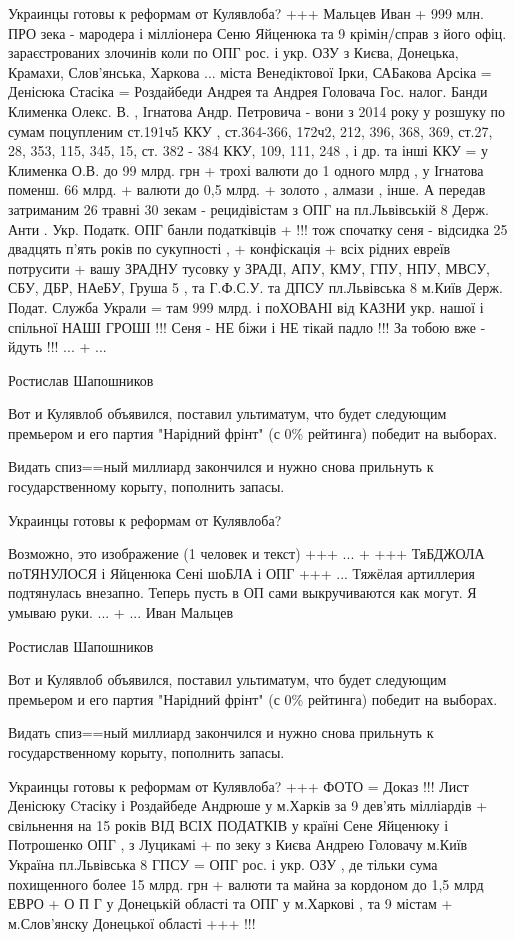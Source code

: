 \begin{itemize}
Украинцы готовы к реформам от Кулявлоба? +++ Мальцев Иван + 999 млн. ПРО зека -
мародера і мілліонера Сеню Яйценюка та 9 крімін/справ з його офіц.
зараєстрованих злочинів коли по ОПГ рос. і укр. ОЗУ з Києва, Донецька, Крамахи,
Слов'янська, Харкова ... міста Венедіктової Ірки, САБакова Арсіка = Денісюка
Стасіка = Роздайбеди Андрея та Андрея Головача Гос. налог. Банди Клименка
Олекс. В. , Ігнатова Андр. Петровича - вони з 2014 року у розшуку по сумам
поцупленим ст.191ч5 ККУ , ст.364-366, 172ч2, 212, 396, 368, 369, ст.27, 28,
353, 115, 345, 15, ст. 382 - 384 ККУ, 109, 111, 248 , і др. та інші ККУ = у
Клименка О.В. до 99 млрд. грн + трохі валюти до 1 одного млрд , у Ігнатова
поменш. 66 млрд. + валюти до 0,5 млрд. + золото , алмази , інше. А передав
затриманим 26 травні 30 зекам - рецидівістам з ОПГ на пл.Львівській 8 Держ.
Анти . Укр. Податк. ОПГ банли податківців + !!! тож спочатку сеня - відсидка 25
двадцять п'ять років по сукупності , + конфіскація + всіх рідних евреїв
потрусити + вашу ЗРАДНУ тусовку у ЗРАДІ, АПУ, КМУ, ГПУ, НПУ, МВСУ, СБУ, ДБР,
НАеБУ, Груша 5 , та Г.Ф.С.У. та ДПСУ пл.Львівська 8 м.Київ Держ. Подат. Служба
Украли = там 999 млрд. і поХОВАНІ від КАЗНИ укр. нашої і спільної НАШІ ГРОШІ
!!! Сеня - НЕ біжи і НЕ тікай падло !!! За тобою вже - йдуть !!! ... + ...

Ростислав Шапошников

Вот и Кулявлоб объявился, поставил ультиматум, что будет следующим премьером и
его партия "Нарідний фрінт" (с 0\% рейтинга) победит на выборах.

Видать спиз==ный миллиард закончился и нужно снова прильнуть к государственному корыту, пополнить запасы.

Украинцы готовы к реформам от Кулявлоба?

Возможно, это изображение (1 человек и текст) +++ ... + +++ ТяБДЖОЛА поТЯНУЛОСЯ
і Яйценюка Сені шоБЛА і ОПГ +++ ... Тяжёлая артиллерия подтянулась внезапно.
Теперь пусть в ОП сами выкручиваются как могут. Я умываю руки. ... + ... Иван
Мальцев

Ростислав Шапошников

Вот и Кулявлоб объявился, поставил ультиматум, что будет следующим премьером и
его партия "Нарідний фрінт" (с 0\% рейтинга) победит на выборах.

Видать спиз==ный миллиард закончился и нужно снова прильнуть к государственному корыту, пополнить запасы.

Украинцы готовы к реформам от Кулявлоба? +++ ФОТО = Доказ !!! Лист Денісюку
Cтасіку і Роздайбеде Андрюше у м.Харків за 9 дев'ять мілліардів + свільнення на
15 років ВІД ВСІХ ПОДАТКІВ у країні Сене Яйценюку і Потрошенко ОПГ , з Луцикамі
+ по зеку з Києва Андрею Головачу м.Київ Україна пл.Львівська 8 ГПСУ = ОПГ рос.
і укр. ОЗУ , де тільки сума похищенного более 15 млрд. грн + валюти та майна за
кордоном до 1,5 млрд ЕВРО + О П Г у Донецькій області та ОПГ у м.Харкові , та 9
містам + м.Слов'янску Донецької області +++ !!!


\end{itemize}
